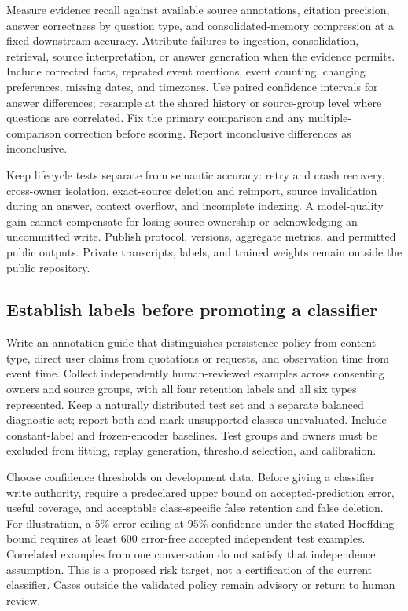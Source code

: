 Measure evidence recall against available source annotations, citation precision, answer correctness by question type, and consolidated-memory compression at a fixed downstream accuracy. Attribute failures to ingestion, consolidation, retrieval, source interpretation, or answer generation when the evidence permits. Include corrected facts, repeated event mentions, event counting, changing preferences, missing dates, and timezones. Use paired confidence intervals for answer differences; resample at the shared history or source-group level where questions are correlated. Fix the primary comparison and any multiple-comparison correction before scoring. Report inconclusive differences as inconclusive.

Keep lifecycle tests separate from semantic accuracy: retry and crash recovery, cross-owner isolation, exact-source deletion and reimport, source invalidation during an answer, context overflow, and incomplete indexing. A model-quality gain cannot compensate for losing source ownership or acknowledging an uncommitted write. Publish protocol, versions, aggregate metrics, and permitted public outputs. Private transcripts, labels, and trained weights remain outside the public repository.

\subsection{Establish labels before promoting a classifier}
Write an annotation guide that distinguishes persistence policy from content type, direct user claims from quotations or requests, and observation time from event time. Collect independently human-reviewed examples across consenting owners and source groups, with all four retention labels and all six types represented. Keep a naturally distributed test set and a separate balanced diagnostic set; report both and mark unsupported classes unevaluated. Include constant-label and frozen-encoder baselines. Test groups and owners must be excluded from fitting, replay generation, threshold selection, and calibration.

Choose confidence thresholds on development data. Before giving a classifier write authority, require a predeclared upper bound on accepted-prediction error, useful coverage, and acceptable class-specific false retention and false deletion. For illustration, a 5\% error ceiling at 95\% confidence under the stated Hoeffding bound requires at least 600 error-free accepted independent test examples. Correlated examples from one conversation do not satisfy that independence assumption. This is a proposed risk target, not a certification of the current classifier. Cases outside the validated policy remain advisory or return to human review.

